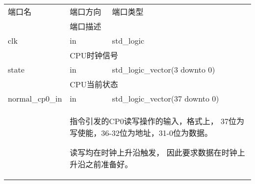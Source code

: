         \begin{tabularx}{\textwidth}{lll}
            \toprule
            端口名          & 端口方向  & 端口类型 \\
            \cmidrule(l){2-3}
            &
            \multicolumn{2}{X}{端口描述} \\
            \midrule
            clk             & in        & std\_logic \\
            \cmidrule(l){2-3}
            &
            \multicolumn{2}{X}{
                CPU时钟信号
            } \\
            \midrule
            state           & in        & std\_logic\_vector(3 downto 0) \\
            \cmidrule(l){2-3}
            &
            \multicolumn{2}{X}{
                CPU当前状态
            } \\
            \midrule
	        normal\_cp0\_in & in        & std\_logic\_vector(37 downto 0) \\
            \cmidrule(l){2-3}
            &
            \multicolumn{2}{X}{
	            指令引发的CP0读写操作的输入，格式上，%
                37位为写使能，36-32位为地址，31-0位为数据。

	            读写均在时钟上升沿触发，%
                因此要求数据在时钟上升沿之前准备好。

}
\end{tabularx}
